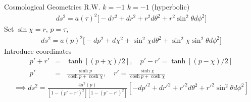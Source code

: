 \documentclass[8pt,draft]{beamer}
\begin{document}

\begin{frame}{Cosmological Geometries R.W. $k=-1$}
	$k=-1$ (hyperbolic)
	\begin{eqnarray*}
		ds^2 = a(\tau)^2\bigg[-d\tau^2 + dr^2 + r^2 d\theta^2 + r^2 \sin^2\theta d\phi^2\bigg]
	\end{eqnarray*}	
	Set $\sin\chi = r$, $p = \tau$, 
	\begin{eqnarray*}
		ds^2 = a(p)^2\bigg[-dp^2 + d\chi^2 + \sin^2\chi d\theta^2 + \sin^2\chi \sin^2\theta d\phi^2\bigg]
	\end{eqnarray*}
	Introduce coordinates
	\begin{eqnarray*}
		p' + r' &=& \tanh[(p+\chi)/2],\quad p'-r'=\tanh[(p-\chi)/2]
		\nonumber\\
		p' &=& \frac{\sinh p}{\cosh p + \cosh \chi}, \quad r' = \frac{\sinh\chi}{\cosh p + \cosh\chi}
	\end{eqnarray*}
	\begin{eqnarray*}
	\implies ds^2 = \frac{4a^2(p)}{[1-(p'+r')^2][1-(p'-r')^2]}[-dp'^2 + dr'^2 +r'^2 d\theta^2 + r'^2\sin^2\theta d\phi^2]
	\end{eqnarray*}
\end{frame}

\end{document}
